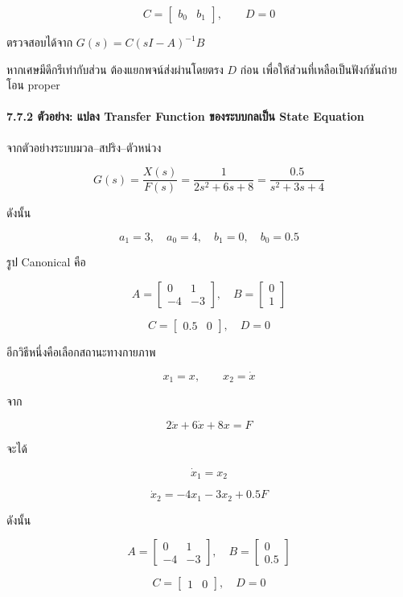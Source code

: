 \[
C=
\begin{bmatrix}
b_0 & b_1
\end{bmatrix},
\qquad
D=0
\]

ตรวจสอบได้จาก $G(s)=C(sI-A)^{-1}B$

หากเศษมีดีกรีเท่ากับส่วน ต้องแยกพจน์ส่งผ่านโดยตรง $D$ ก่อน เพื่อให้ส่วนที่เหลือเป็นฟังก์ชันถ่ายโอน proper

\paragraph{7.7.2 ตัวอย่าง: แปลง Transfer Function ของระบบกลเป็น State Equation}

จากตัวอย่างระบบมวล–สปริง–ตัวหน่วง

\[
G(s)=\frac{X(s)}{F(s)}
=\frac{1}{2s^2+6s+8}
=\frac{0.5}{s^2+3s+4}
\]

ดังนั้น

\[
a_1=3,\quad a_0=4,\quad b_1=0,\quad b_0=0.5
\]

รูป Canonical คือ

\[
A=
\begin{bmatrix}
0 & 1\\
-4 & -3
\end{bmatrix},
\quad
B=
\begin{bmatrix}
0\\
1
\end{bmatrix}
\]

\[
C=
\begin{bmatrix}
0.5 & 0
\end{bmatrix},
\quad
D=0
\]

อีกวิธีหนึ่งคือเลือกสถานะทางกายภาพ

\[
x_1=x,\qquad x_2=\dot{x}
\]

จาก

\[
2\ddot{x}+6\dot{x}+8x=F
\]

จะได้

\[
\dot{x}_1=x_2
\]

\[
\dot{x}_2=-4x_1-3x_2+0.5F
\]

ดังนั้น

\[
A=
\begin{bmatrix}
0 & 1\\
-4 & -3
\end{bmatrix},
\quad
B=
\begin{bmatrix}
0\\
0.5
\end{bmatrix}
\]

\[
C=
\begin{bmatrix}
1 & 0
\end{bmatrix},
\quad
D=0
\]


